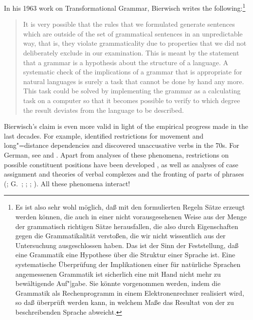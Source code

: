 In his 1963 work on Transformational Grammar, Bierwisch writes the following:\footnote{
Es ist also sehr wohl möglich, daß mit den formulierten Regeln Sätze erzeugt werden können,
die auch in einer nicht vorausgesehenen Weise aus der Menge der grammatisch richtigen Sätze herausfallen,
die also durch Eigenschaften gegen die Grammatikalität verstoßen, die wir nicht wissentlich aus
der Untersuchung ausgeschlossen haben. Das ist der Sinn der Feststellung, daß eine Grammatik
eine Hypothese über die Struktur einer Sprache ist. Eine systematische Überprüfung der Implikationen
einer für natürliche Sprachen angemessenen Grammatik ist sicherlich eine mit Hand nicht mehr
zu bewältigende Auf"|gabe. Sie könnte vorgenommen werden, indem die Grammatik als Rechenprogramm in einem
Elektronenrechner realisiert wird, so daß überprüft werden kann, in welchem Maße das Resultat
von der zu beschreibenden Sprache abweicht.}
\begin{quote}
It is very possible that the rules that we formulated generate
sentences which are outside of the set of grammatical sentences in an
unpredictable way, that is, they violate grammaticality due to
properties that we did not deliberately exclude in our examination. This
is meant by the statement that a grammar is a hypothesis about the
structure of a language. A systematic check of the implications of a
grammar that is appropriate for natural languages is surely a task that
cannot be done by hand any more. This task could be solved by
implementing the grammar as a calculating task on a computer so that it
becomes possible to verify to which degree the result deviates from the
language to be described. \citep*[]{Bierwisch63}
\end{quote}
Bierwisch's claim is even more valid in light of the empirical progress made in the last decades. For example,
\citet{Ross67} identified restrictions for movement and long"=distance dependencies and \citet{Perlmutter78} discovered
unaccusative verbs in the 70s. For German, see  and .
Apart from analyses of these phenomena, restrictions on possible constituent positions have been developed
\citep{Lenerz77}, as well as analyses of case assignment \citep*{YMJ87,Meurers99b,Prze99} and theories of
verbal complexes and the fronting of parts of phrases  (\citealp{Evers75a,Grewendorf88a,HN94a,Kiss95a}; G.\ \citealp{GMueller98a};
\citealp{Meurers99c}; \citealp{Mueller99a,Mueller2002b}; \citealp{deKuthy2002a}). All these
phenomena interact!

